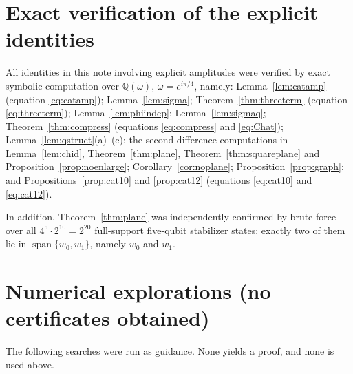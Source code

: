 \documentclass[11pt]{article}
\theoremstyle{plain}
\theoremstyle{definition}
\newcommand{\Q}{\mathbb{Q}}
\newcommand{\spn}{\operatorname{span}}
\begin{document}
\appendix

\section{Exact verification of the explicit identities}\label{app:verify}

All identities in this note involving explicit amplitudes were verified by exact
symbolic computation over $\Q(\omega)$, $\omega=e^{i\pi/4}$, namely:
Lemma~\ref{lem:catamp} (equation \eqref{eq:catamp}); Lemma~\ref{lem:sigma};
Theorem~\ref{thm:threeterm} (equation \eqref{eq:threeterm}); Lemma~\ref{lem:phiindep};
Lemma~\ref{lem:sigmaq}; Theorem~\ref{thm:compress} (equations \eqref{eq:compress} and
\eqref{eq:Chat}); Lemma~\ref{lem:qstruct}(a)--(c); the second-difference computations in
Lemma~\ref{lem:chid}, Theorem~\ref{thm:plane}, Theorem~\ref{thm:squareplane} and
Proposition~\ref{prop:noenlarge}; Corollary~\ref{cor:noplane};
Proposition~\ref{prop:graph}; and Propositions~\ref{prop:cat10} and \ref{prop:cat12}
(equations \eqref{eq:cat10} and \eqref{eq:cat12}).

In addition, Theorem~\ref{thm:plane} was independently confirmed by brute force over all
$4^5\cdot2^{10}=2^{20}$ full-support five-qubit stabilizer states: exactly two of them
lie in $\spn\{w_0,w_1\}$, namely $w_0$ and $w_1$.

\section{Numerical explorations (no certificates obtained)}\label{app:numerics}

The following searches were run as guidance. None yields a proof, and none is used
above.
\end{document}
